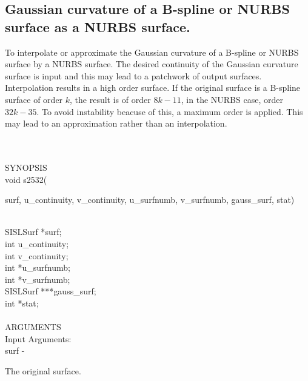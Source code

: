 \subsection{Gaussian curvature of a B-spline or NURBS 
            surface as a NURBS surface.}
\begin{minipg1}
To interpolate or approximate the Gaussian curvature of a B-spline or NURBS 
            surface by a NURBS surface. 
            The desired continuity of the Gaussian curvature surface is
            input and this may lead to a patchwork of output surfaces. 
            Interpolation results in a high order surface.
            If the original surface is a B-spline surface of order $k$,
            the result is of order $8k -11$, in the NURBS case,
            order $32k-35$.
            To avoid instability beacuse of this, a maximum order is
            applied. This may lead to an approximation rather than
            an interpolation.
\end{minipg1} \\ \\
SYNOPSIS\\
        \> void s2532(\begin{minipg3}
            {\fov surf}, {\fov u\_continuity}, {\fov v\_continuity}, {\fov u\_surfnumb}, 
	    {\fov v\_surfnumb}, {\fov gauss\_surf}, {\fov stat})
                \end{minipg3}\\
                \>\>    SISLSurf \> *{\fov surf};\\
                \>\>    int    \>  {\fov u\_continuity};\\
                \>\>    int    \>  {\fov v\_continuity};\\
                \>\>    int    \>  *{\fov u\_surfnumb};\\
                \>\>    int    \>  *{\fov v\_surfnumb};\\
                \>\>    SISLSurf \> ***{\fov gauss\_surf};\\
                \>\>    int    \>  *{\fov stat};\\
\\
ARGUMENTS\\
	\>Input Arguments:\\
        \>\>    {\fov surf}\> - \>  \begin{minipg2}
                     The original surface.
                               \end{minipg2}\\[0.8ex]
